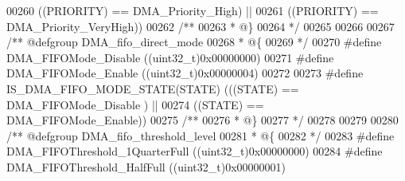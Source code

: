 \begin{DoxyCode}
00260                                    \textcolor{preprocessor}{(}\textcolor{preprocessor}{(}\textcolor{preprocessor}{PRIORITY}\textcolor{preprocessor}{)} \textcolor{preprocessor}{==} DMA_Priority_High\textcolor{preprocessor}{)}   \textcolor{preprocessor}{||}
00261                                    \textcolor{preprocessor}{(}\textcolor{preprocessor}{(}\textcolor{preprocessor}{PRIORITY}\textcolor{preprocessor}{)} \textcolor{preprocessor}{==} DMA_Priority_VeryHigh\textcolor{preprocessor}{)}\textcolor{preprocessor}{)}
00262 \textcolor{comment}{/**}
00263 \textcolor{comment}{  * @\}}
00264 \textcolor{comment}{  */}
00265 
00266 
00267 \textcolor{comment}{/** @defgroup DMA\_fifo\_direct\_mode }
00268 \textcolor{comment}{  * @\{}
00269 \textcolor{comment}{  */}
00270 \textcolor{preprocessor}{#}\textcolor{preprocessor}{define} \textcolor{preprocessor}{DMA\_FIFOMode\_Disable}              \textcolor{preprocessor}{(}\textcolor{preprocessor}{(}\textcolor{preprocessor}{uint32\_t}\textcolor{preprocessor}{)}0x00000000\textcolor{preprocessor}{)}
00271 \textcolor{preprocessor}{#}\textcolor{preprocessor}{define} \textcolor{preprocessor}{DMA\_FIFOMode\_Enable}               \textcolor{preprocessor}{(}\textcolor{preprocessor}{(}\textcolor{preprocessor}{uint32\_t}\textcolor{preprocessor}{)}0x00000004\textcolor{preprocessor}{)}
00272 
00273 \textcolor{preprocessor}{#}\textcolor{preprocessor}{define} \textcolor{preprocessor}{IS\_DMA\_FIFO\_MODE\_STATE}\textcolor{preprocessor}{(}\textcolor{preprocessor}{STATE}\textcolor{preprocessor}{)} \textcolor{preprocessor}{(}\textcolor{preprocessor}{(}\textcolor{preprocessor}{(}\textcolor{preprocessor}{STATE}\textcolor{preprocessor}{)} \textcolor{preprocessor}{==} DMA_FIFOMode_Disable \textcolor{preprocessor}{)} \textcolor{preprocessor}{||}
00274                                        \textcolor{preprocessor}{(}\textcolor{preprocessor}{(}\textcolor{preprocessor}{STATE}\textcolor{preprocessor}{)} \textcolor{preprocessor}{==} DMA_FIFOMode_Enable\textcolor{preprocessor}{)}\textcolor{preprocessor}{)}
00275 \textcolor{comment}{/**}
00276 \textcolor{comment}{  * @\}}
00277 \textcolor{comment}{  */}
00278 
00279 
00280 \textcolor{comment}{/** @defgroup DMA\_fifo\_threshold\_level }
00281 \textcolor{comment}{  * @\{}
00282 \textcolor{comment}{  */}
00283 \textcolor{preprocessor}{#}\textcolor{preprocessor}{define} \textcolor{preprocessor}{DMA\_FIFOThreshold\_1QuarterFull}    \textcolor{preprocessor}{(}\textcolor{preprocessor}{(}\textcolor{preprocessor}{uint32\_t}\textcolor{preprocessor}{)}0x00000000\textcolor{preprocessor}{)}
00284 \textcolor{preprocessor}{#}\textcolor{preprocessor}{define} \textcolor{preprocessor}{DMA\_FIFOThreshold\_HalfFull}        \textcolor{preprocessor}{(}\textcolor{preprocessor}{(}\textcolor{preprocessor}{uint32\_t}\textcolor{preprocessor}{)}0x00000001\textcolor{preprocessor}{)}

\end{DoxyCode}
